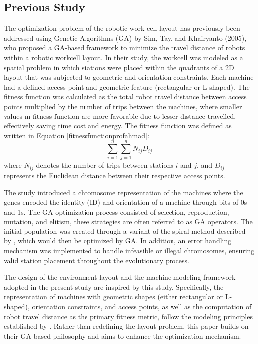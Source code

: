\documentclass{article}
\begin{document}
\subsection{Previous Study}

The optimization problem of the robotic work cell layout has previously been addressed using Genetic Algorithms (GA) by Sim, Tay, and Khairyanto (2005), who proposed a GA-based framework to minimize the travel distance of robots within a robotic workcell layout. In their study, the workcell was modeled as a spatial problem in which stations were placed within the quadrants of a 2D layout that was subjected to geometric and orientation constraints. Each machine had a defined access point and geometric feature (rectangular or L-shaped). The fitness function was calculated as the total robot travel distance between access points multiplied by the number of trips between the machines, where smaller values in fitness function are more favorable due to lesser distance travelled, effectively saving time cost and energy. The fitness function was defined as written in Equation \ref{fitnessfunctionprofahmad}:
\begin{equation}
\sum_{i=1}^{n} \sum_{j=1}^{n} N_{ij} D_{ij}
\label{fitnessfunctionprofahmad}
\end{equation}
where $N_{ij}$ denotes the number of trips between stations $i$ and $j$, and $D_{ij}$ represents the Euclidean distance between their respective access points.

The study introduced a chromosome representation of the machines where the genes encoded the identity (ID) and orientation of a machine through bits of 0s and 1s. The GA optimization process consisted of selection, reproduction, mutation, and elitism, these strategies are often referred to as GA operators. The initial population was created through a variant of the spiral method described by \textcite{islierspiral}, which would then be optimized by GA. In addition, an error handling mechanism was implemented to handle infeasible or illegal chromosomes, ensuring valid station placement throughout the evolutionary process.

The design of the environment layout and the machine modeling framework adopted in the present study are inspired by this study. Specifically, the representation of machines with geometric shapes (either rectangular or L-shaped), orientation constraints, and access points, as well as the computation of robot travel distance as the primary fitness metric, follow the modeling principles established by \parencite{sim2005rwl}. Rather than redefining the layout problem, this paper builds on their GA-based philosophy and aims to enhance the optimization mechanism.
\end{document}
